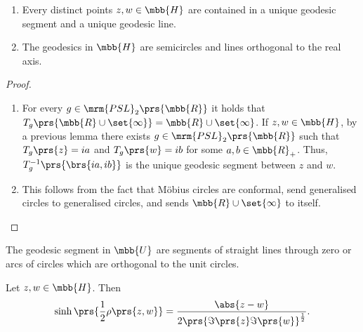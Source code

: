 \documentclass[10pt, twoside]{book}
\begin{document}
\begin{theorem}

\begin{enumerate}
\item
Every distinct points $z,w \in \mbb{H}$ are contained in a unique geodesic segment and a unique geodesic line.

\item The geodesics in $\mbb{H}$ are semicircles and lines orthogonal to the real axis.
\end{enumerate}
\end{theorem}

\begin{proof}
\begin{enumerate}
\item
For every $g \in \mrm{PSL}_2\prs{\mbb{R}}$ it holds that $T_g\prs{\mbb{R} \cup \set{\infty}} = \mbb{R} \cup \set{\infty}$. If $z,w \in \mbb{H}$, by a previous lemma there exists $g \in \mrm{PSL}_2\prs{\mbb{R}}$ such that $T_g\prs{z} = ia$ and $T_g\prs{w} = ib$ for some $a,b \in \mbb{R}_+$.
Thus, $T_g^{-1} \prs{\brs{ia, ib}}$ is the unique geodesic segment between $z$ and $w$.

\item This follows from the fact that Möbius circles are conformal, send generalised circles to generalised circles, and sends $\mbb{R} \cup \set{\infty}$ to itself.      
\end{enumerate}
\end{proof}

\begin{corollary}
The geodesic segment in $\mbb{U}$ are segments of straight lines through zero or arcs of circles which are orthogonal to the unit circles.
\end{corollary}

\begin{theorem}
Let $z,w \in \mbb{H}$. Then
\begin{align*}
\sinh\prs{\frac{1}{2} \rho\prs{z,w}} = \frac{\abs{z-w}}{2 \prs {\Im\prs{z} \Im\prs{w}}^{\frac{1}{2}}} \text{.}
\end{align*}
\end{theorem}
\end{document}
